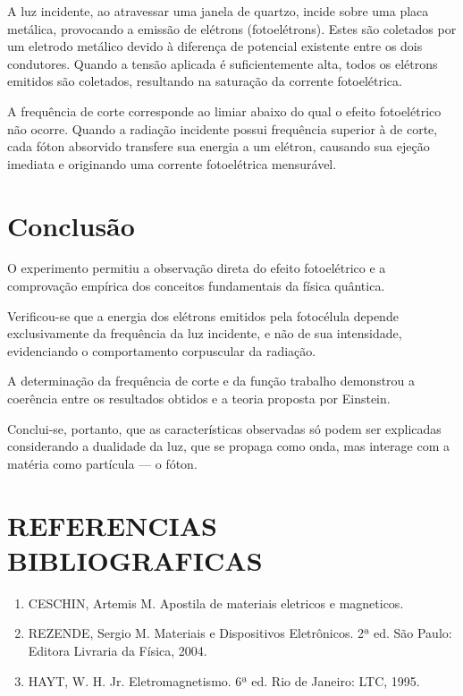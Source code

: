 \documentclass[10pt,twocolumn,letterpaper]{article}
\begin{document}
\hspace{1cm} A luz incidente, ao atravessar uma janela de quartzo, incide sobre uma placa metálica, provocando a emissão de elétrons (fotoelétrons). Estes são coletados por um eletrodo metálico devido à diferença de potencial existente entre os dois condutores.
Quando a tensão aplicada é suficientemente alta, todos os elétrons emitidos são coletados, resultando na saturação da corrente fotoelétrica.

\hspace{1cm} A frequência de corte corresponde ao limiar abaixo do qual o efeito fotoelétrico não ocorre. Quando a radiação incidente possui frequência superior à de corte, cada fóton absorvido transfere sua energia a um elétron, causando sua ejeção imediata e originando uma corrente fotoelétrica mensurável.


\section{Conclusão}

\hspace{1cm} O experimento permitiu a observação direta do efeito fotoelétrico e a comprovação empírica dos conceitos fundamentais da física quântica.

\hspace{1cm} Verificou-se que a energia dos elétrons emitidos pela fotocélula depende exclusivamente da frequência da luz incidente, e não de sua intensidade, evidenciando o comportamento corpuscular da radiação.

\hspace{1cm} A determinação da frequência de corte e da função trabalho demonstrou a coerência entre os resultados obtidos e a teoria proposta por Einstein.

\hspace{1cm} Conclui-se, portanto, que as características observadas só podem ser explicadas considerando a dualidade da luz, que se propaga como onda, mas interage com a matéria como partícula — o fóton.

\section{REFERENCIAS BIBLIOGRAFICAS}

{\small
\begin{enumerate}

    \item CESCHIN, Artemis M. Apostila de materiais eletricos e magneticos.

    \item REZENDE, Sergio M. Materiais e Dispositivos Eletrônicos. 2ª ed. São Paulo: Editora Livraria da Física, 2004.

    \item HAYT, W. H. Jr. Eletromagnetismo. 6ª ed. Rio de Janeiro: LTC, 1995.
    
\end{enumerate}
}
\end{document}
